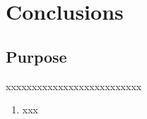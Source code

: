 \chapter{Conclusions}

\section{Purpose}
xxxxxxxxxxxxxxxxxxxxxxxxxx
\begin{enumerate}
 \item xxx
\end{enumerate}

